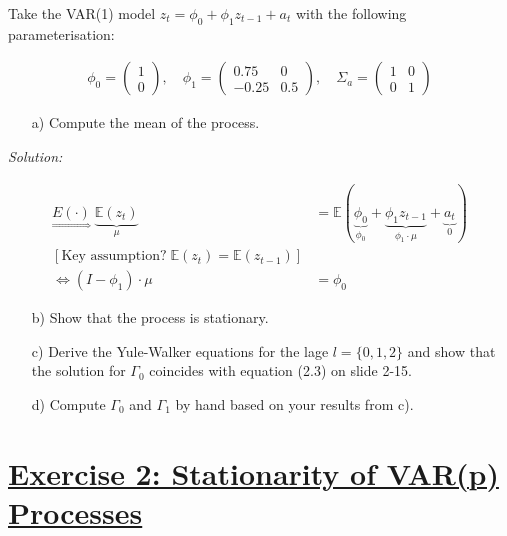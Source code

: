\documentclass[12pt,a4paper]{article}
\newcommand{\tmpsection}[1]{}
\let\tmpsection=\section
\renewcommand{\section}[1]{\tmpsection{\underline{#1}} }
\begin{document}
Take the VAR(1) model \(z_t = \phi_0 + \phi_1 z_{t-1} + a_t\) with the
following parameterisation:

\begin{align*}
    \phi_0 = \begin{pmatrix} 1 \\ 0 \end{pmatrix}, \quad \phi_1 = \begin{pmatrix} 0.75 & 0 \\ -0.25 & 0.5 \end{pmatrix}, \quad \Sigma_a = \begin{pmatrix} 1 & 0 \\ 0 & 1 \end{pmatrix}
\end{align*}

\begin{itemize}
    \item[a)] Compute the mean of the process.
\end{itemize}

\emph{Solution:}

\begin{align*}
  \underset{\Rightarrow}{E(\cdot)} \; \underbrace{ \mathbb{E} (z_t)}_{\mu} & = \mathbb{E} \left(  \underbrace{\phi_0}_{\phi_0} + \underbrace{\phi_1 z_{t -1}}_{\phi_1 \cdot \mu}+ \underbrace{a_t}_{0}\right)\\
  \left[ \text{Key assumption?} \;  \mathbb{E} (z_t)  = \mathbb{E} (z_{t-1}) \right]\\
  \Leftrightarrow \left( I - \phi_1 \right) \cdot \mu & = \phi_0
\end{align*}

\begin{itemize}
    \item[b)] Show that the process is stationary.
    \item[c)] Derive the Yule-Walker equations for the lage $l = \{0,1,2 \}$ and show that the solution for $\Gamma_0$ coincides with equation (2.3) on slide 2-15.
    \item[d)] Compute $\Gamma_0$ and $\Gamma_1$ by hand based on your results from c).
\end{itemize}

\hypertarget{exercise-2-stationarity-of-varp-processes}{%
\section{Exercise 2: Stationarity of VAR(p)
Processes}\label{exercise-2-stationarity-of-varp-processes}}
\end{document}
